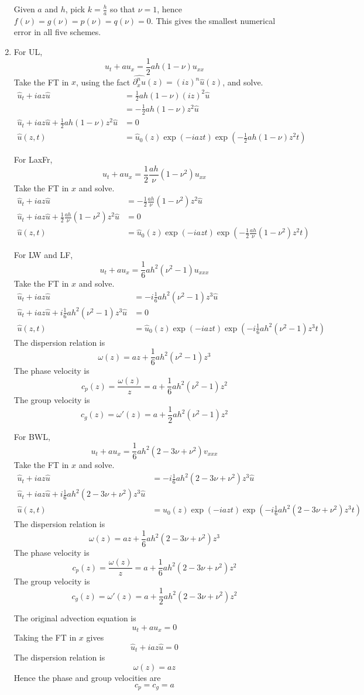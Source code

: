 \documentclass{article}
\newcommand{\ptl}{\partial}
\begin{document}
\begin{enumerate}[label=(\alph*)]
Given $a$ and $h$, pick $k=\frac ha$ so that $\nu=1$, hence $f(\nu)=g(\nu)=p(\nu)=q(\nu)=0$. This gives the smallest numerical error in all five schemes.


\item For UL,
$$u_t + au_x = \frac12ah(1-\nu)u_{xx}$$
Take the FT in $x$, using the fact $\widehat{\ptl_x^nu}(z)=(iz)^n\hat u(z)$, and solve.
\begin{align*}
	\hat u_t + iaz\hat u &= \frac12ah(1-\nu)(iz)^2\hat u\\
	&= -\frac12ah(1-\nu)z^2\hat u\\
	\hat u_t + iaz\hat u + \frac12ah(1-\nu)z^2\hat u &= 0\\
	\hat u(z,t) &= \hat u_0(z)\exp(-iazt)\exp(-\frac12ah(1-\nu)z^2t)
\end{align*}

For LaxFr,
$$u_t + au_x = \frac12\frac{ah}{\nu}(1-\nu^2)u_{xx}$$
Take the FT in $x$ and solve.
\begin{align*}
	\hat u_t + iaz\hat u &= -\frac12\frac{ah}{\nu}(1-\nu^2)z^2\hat u\\
	\hat u_t + iaz\hat u + \frac12\frac{ah}{\nu}(1-\nu^2)z^2\hat u &= 0\\
	\hat u(z,t) &= \hat u_0(z)\exp(-iazt)\exp(-\frac12\frac{ah}{\nu}(1-\nu^2)z^2t)
\end{align*}

For LW and LF,
$$u_t + au_x = \frac16ah^2(\nu^2-1)u_{xxx}$$
Take the FT in $x$ and solve.
\begin{align*}
	\hat u_t + iaz\hat u &= -i\frac16ah^2(\nu^2-1)z^3\hat u\\
	\hat u_t + iaz\hat u + i\frac16ah^2(\nu^2-1)z^3\hat u &= 0\\
	\hat u(z,t) &= \hat u_0(z)\exp(-iazt)\exp(-i\frac16ah^2(\nu^2-1)z^3t)
\end{align*}
The dispersion relation is
$$\omega(z) = az + \frac16ah^2(\nu^2-1)z^3$$
The phase velocity is
$$c_p(z) = \frac{\omega(z)}{z} = a + \frac16ah^2(\nu^2-1)z^2$$
The group velocity is
$$c_g(z) = \omega'(z) = a + \frac12ah^2(\nu^2-1)z^2$$

For BWL,
$$u_t + au_x = \frac16ah^2(2-3\nu+\nu^2)v_{xxx}$$
Take the FT in $x$ and solve.
\begin{align*}
	\hat u_t + iaz\hat u &= -i\frac16ah^2(2-3\nu+\nu^2)z^3\hat u\\
	\hat u_t + iaz\hat u + i\frac16ah^2(2-3\nu+\nu^2)z^3\hat u\\
	\hat u(z,t) &= \hat u_0(z)\exp(-iazt)\exp(-i\frac16ah^2(2-3\nu+\nu^2)z^3t)
\end{align*}
The dispersion relation is
$$\omega(z) = az + \frac16ah^2(2-3\nu+\nu^2)z^3$$
The phase velocity is
$$c_p(z) = \frac{\omega(z)}{z} = a + \frac16ah^2(2-3\nu+\nu^2)z^2$$
The group velocity is
$$c_g(z) = \omega'(z) = a + \frac12ah^2(2-3\nu+\nu^2)z^2$$

The original advection equation is
$$u_t + au_x = 0$$
Taking the FT in $x$ gives
$$\hat u_t + iaz\hat u = 0$$
The dispersion relation is
$$\omega(z) = az$$
Hence the phase and group velocities are
$$c_p = c_g = a$$

\end{enumerate}


	
\end{document}
